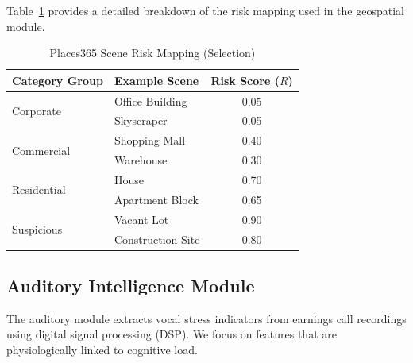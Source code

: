 \documentclass[conference]{IEEEtran}
\begin{document}
Table~\ref{tab:scene_mapping} provides a detailed breakdown of the risk mapping used in the geospatial module.

\begin{table}[!t]
 \caption{Places365 Scene Risk Mapping (Selection)}
 \label{tab:scene_mapping}
 \centering
 \begin{tabular}{llc}
 \toprule
 \textbf{Category Group} & \textbf{Example Scene} & \textbf{Risk Score ($R$)} \\
 \midrule
 \multirow{2}{*}{Corporate} & Office Building & 0.05 \\
                            & Skyscraper      & 0.05 \\
 \midrule
 \multirow{2}{*}{Commercial} & Shopping Mall  & 0.40 \\
                            & Warehouse       & 0.30 \\
 \midrule
 \multirow{2}{*}{Residential} & House          & 0.70 \\
                             & Apartment Block & 0.65 \\
 \midrule
 \multirow{2}{*}{Suspicious}  & Vacant Lot     & 0.90 \\
                             & Construction Site & 0.80 \\
 \bottomrule
 \end{tabular}
\end{table}

\subsection{Auditory Intelligence Module}

The auditory module extracts vocal stress indicators from earnings call recordings using digital signal processing (DSP). We focus on features that are physiologically linked to cognitive load.
\end{document}
